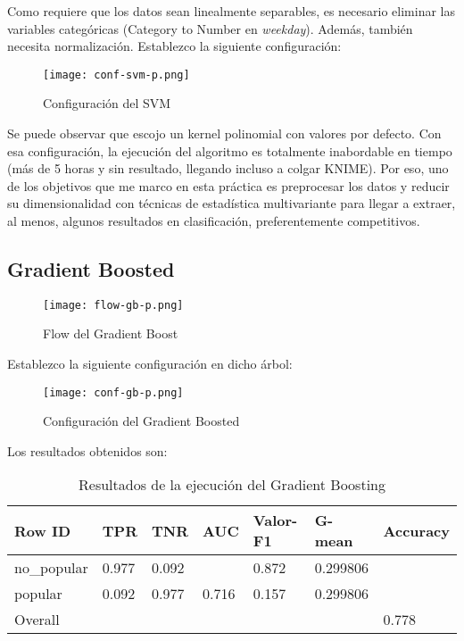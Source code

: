 Como requiere que los datos sean linealmente separables, es necesario eliminar las variables categóricas (Category to Number en \textit{weekday}). Además, también necesita normalización. Establezco la siguiente configuración:

\begin{figure}[H] %
	\centering
	\texttt{[image: conf-svm-p.png]}  %
	\caption{Configuración del SVM} 
	\label{fig:conf-svm}
\end{figure}

Se puede observar que escojo un kernel polinomial con valores por defecto. Con esa configuración, la ejecución del algoritmo es totalmente inabordable en tiempo (más de 5 horas y sin resultado, llegando incluso a colgar KNIME). Por eso, uno de los objetivos que me marco en esta práctica es preprocesar los datos y reducir su dimensionalidad con técnicas de estadística multivariante para llegar a extraer, al menos, algunos resultados en clasificación, preferentemente competitivos.

\subsection{Gradient Boosted}

\begin{figure}[H] %
	\centering
	\texttt{[image: flow-gb-p.png]}  %
	\caption{Flow del Gradient Boost} 
	\label{fig:flow-gb}
\end{figure}

Establezco la siguiente configuración en dicho árbol:

\begin{figure}[H] %
	\centering
	\texttt{[image: conf-gb-p.png]}  %
	\caption{Configuración del Gradient Boosted} 
	\label{fig:conf-gb}
\end{figure}

Los resultados obtenidos son:

\begin{table}[H]
	\centering
	\begin{tabular}{|l|l|l|l|l|l|l|}
		\hline
		Row ID      & TPR   & TNR   & AUC   & Valor-F1 & G-mean   & Accuracy \\ \hline
		no\_popular & 0.977 & 0.092 &       & 0.872    & 0.299806 &          \\ \hline
		popular     & 0.092 & 0.977 & 0.716 & 0.157    & 0.299806 &          \\ \hline
		Overall     &       &       &       &          &          & 0.778    \\ \hline
	\end{tabular}
	\caption{Resultados de la ejecución del Gradient Boosting}
	\label{tab:gb}
\end{table}

